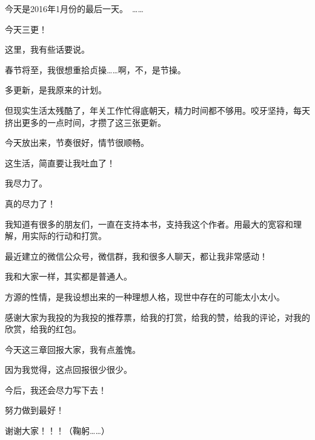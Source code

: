 \begin{this_body}
今天是2016年1月份的最后一天。　……

今天三更！

这里，我有些话要说。

春节将至，我很想重拾贞操……啊，不，是节操。

多更新，是我原来的计划。

但现实生活太残酷了，年关工作忙得底朝天，精力时间都不够用。咬牙坚持，每天挤出更多的一点时间，才攒了这三张更新。

今天放出来，节奏很好，情节很顺畅。

这生活，简直要让我吐血了！

我尽力了。

真的尽力了！

我知道有很多的朋友们，一直在支持本书，支持我这个作者。用最大的宽容和理解，用实际的行动和打赏。

最近建立的微信公众号，微信群，我和很多人聊天，都让我非常感动！

我和大家一样，其实都是普通人。

方源的性情，是我设想出来的一种理想人格，现世中存在的可能太小太小。

感谢大家为我投的为我投的推荐票，给我的打赏，给我的赞，给我的评论，对我的欣赏，给我的红包。

今天这三章回报大家，我有点羞愧。

因为我觉得，这点回报很少很少。

今后，我还会尽力写下去！

努力做到最好！

谢谢大家！！！（鞠躬……）

\end{this_body}

